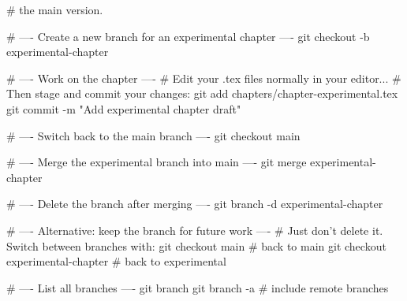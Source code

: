 # the main version.

# ---- Create a new branch for an experimental chapter ----
git checkout -b experimental-chapter

# ---- Work on the chapter ----
# Edit your .tex files normally in your editor...
# Then stage and commit your changes:
git add chapters/chapter-experimental.tex
git commit -m "Add experimental chapter draft"

# ---- Switch back to the main branch ----
git checkout main

# ---- Merge the experimental branch into main ----
git merge experimental-chapter

# ---- Delete the branch after merging ----
git branch -d experimental-chapter

# ---- Alternative: keep the branch for future work ----
# Just don't delete it. Switch between branches with:
git checkout main           # back to main
git checkout experimental-chapter  # back to experimental

# ---- List all branches ----
git branch
git branch -a    # include remote branches

